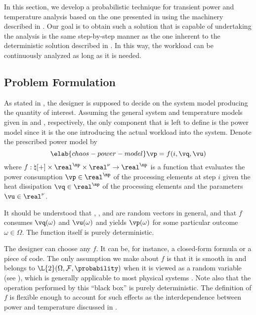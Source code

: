 In this section, we develop a probabilistic technique for transient power and
temperature analysis based on the one presented in
 using the machinery described in
. Our goal is to obtain such a solution that is
capable of undertaking the analysis is the same step-by-step manner as the one
inherent to the deterministic solution described in
. In this way, the workload can be continuously
analyzed as long as it is needed.

\subsection{Problem Formulation}

As stated in , the designer is supposed to
decide on the system model producing the quantity of interest. Assuming the
general system and temperature models given in  and
, respectively, the only component that is left to
define is the power model since it is the one introducing the actual workload
into the system. Denote the prescribed power model by
\begin{equation} \elab{chaos-power-model}
  \vp = f(i, \vq, \vu)
\end{equation}
where $f: \natural[+] \times \real^\np \times \real^\nu \to \real^\np$ is a
function that evaluates the power consumption $\vp \in \real^\np$ of the
processing elements at step $i$ given the heat dissipation $\vq \in \real^\np$
of the processing elements and the parameters $\vu \in \real^\nu$.

\begin{remark}
It should be understood that \vp, \vq, and \vu are random vectors in general,
and that $f$ consumes $\vq(\omega)$ and $\vu(\omega)$ and yields $\vp(\omega)$
for some particular outcome $\omega \in \Omega$. The function itself is purely
deterministic.
\end{remark}

The designer can choose any $f$. It can be, for instance, a closed-form formula
or a piece of code. The only assumption we make about $f$ is that it is smooth
in \vz and belongs to $\L{2}(\Omega, \mathcal{F}, \probability)$ when it is
viewed as a random variable (see ), which is generally
applicable to most physical systems \cite{xiu2010}. Note also that the operation
performed by this ``black box'' is purely deterministic. The definition of $f$
is flexible enough to account for such effects as the interdependence between
power and temperature discussed in .

